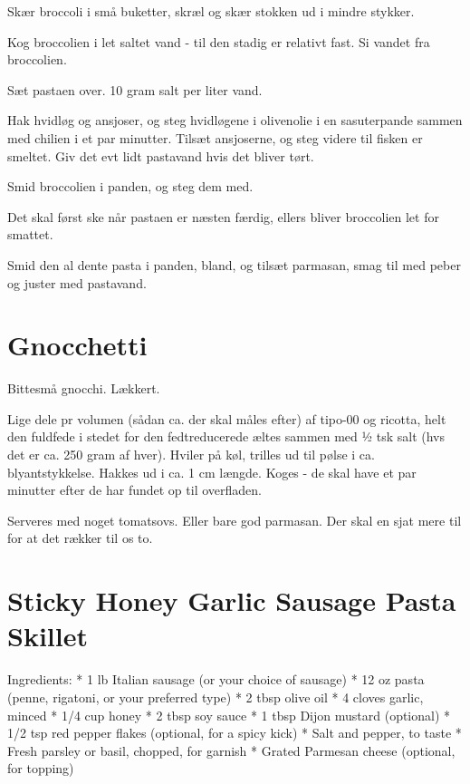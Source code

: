 \documentclass[
]{book}
\begin{document}
Skær broccoli i små buketter, skræl og skær stokken ud i mindre stykker.

Kog broccolien i let saltet vand - til den stadig er relativt fast. Si vandet fra broccolien.

Sæt pastaen over. 10 gram salt per liter vand.

Hak hvidløg og ansjoser, og steg hvidløgene i olivenolie i en sasuterpande sammen med chilien i et par minutter. Tilsæt ansjoserne, og steg videre til fisken er smeltet. Giv det evt lidt pastavand hvis det bliver tørt.

Smid broccolien i panden, og steg dem med.

Det skal først ske når pastaen er næsten færdig, ellers bliver broccolien let for smattet.

Smid den al dente pasta i panden, bland, og tilsæt parmasan, smag til med peber og juster med pastavand.

\hypertarget{gnocchetti}{%
\section{Gnocchetti}\label{gnocchetti}}

Bittesmå gnocchi. Lækkert.

Lige dele pr volumen (sådan ca. der skal måles efter) af tipo-00 og ricotta,
helt den fuldfede i stedet for den fedtreducerede æltes sammen med ½ tsk salt
(hvs det er ca. 250 gram af hver).
Hviler på køl, trilles ud til pølse i ca. blyantstykkelse.
Hakkes ud i ca. 1 cm længde.
Koges - de skal have et par minutter efter de har fundet op til overfladen.

Serveres med noget tomatsovs. Eller bare god parmasan. Der skal en sjat mere
til for at det rækker til os to.

\hypertarget{sticky-honey-garlic-sausage-pasta-skillet}{%
\section{Sticky Honey Garlic Sausage Pasta Skillet}\label{sticky-honey-garlic-sausage-pasta-skillet}}

Ingredients:
* 1 lb Italian sausage (or your choice of sausage)
* 12 oz pasta (penne, rigatoni, or your preferred type)
* 2 tbsp olive oil
* 4 cloves garlic, minced
* 1/4 cup honey
* 2 tbsp soy sauce
* 1 tbsp Dijon mustard (optional)
* 1/2 tsp red pepper flakes (optional, for a spicy kick)
* Salt and pepper, to taste
* Fresh parsley or basil, chopped, for garnish
* Grated Parmesan cheese (optional, for topping)
\end{document}
